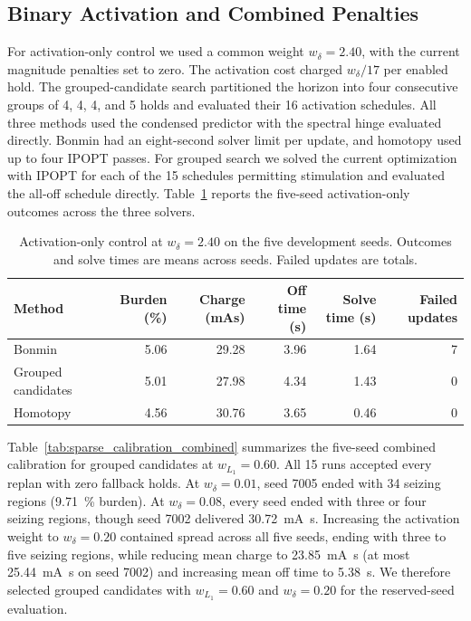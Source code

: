 \FloatBarrier
\subsection{Binary Activation and Combined Penalties}

For activation-only control we used a common weight \(w_\delta=2.40\), with the current magnitude penalties set to zero.
The activation cost charged \(w_\delta/17\) per enabled hold.
The grouped-candidate search partitioned the horizon into four consecutive groups of 4, 4, 4, and 5 holds and evaluated their 16 activation schedules.
All three methods used the condensed predictor with the spectral hinge evaluated directly.
Bonmin had an eight-second solver limit per update, and homotopy used up to four IPOPT passes.
For grouped search we solved the current optimization with IPOPT for each of the 15 schedules permitting stimulation and evaluated the all-off schedule directly.
Table~\ref{tab:sparse_calibration_binary} reports the five-seed activation-only outcomes across the three solvers.

\begin{table}
  \centering
  \caption{Activation-only control at \(w_\delta=2.40\) on the five development seeds.
  Outcomes and solve times are means across seeds. Failed updates are totals.}\label{tab:sparse_calibration_binary}
  \begin{tabular}{@{}lrrrrr@{}}
    \toprule
    Method & Burden (\%) & Charge (mAs) & Off time (s) & Solve time (s) & Failed updates \\
    \midrule
    Bonmin             & 5.06 & 29.28 & 3.96 & 1.64 & 7 \\
    Grouped candidates & 5.01 & 27.98 & 4.34 & 1.43 & 0 \\
    Homotopy           & 4.56 & 30.76 & 3.65 & 0.46 & 0 \\
    \bottomrule
  \end{tabular}
\end{table}

Table~\ref{tab:sparse_calibration_combined} summarizes the five-seed combined calibration for grouped candidates at \(w_{L_1}=0.60\).
All 15 runs accepted every replan with zero fallback holds.
At \(w_\delta=0.01\), seed 7005 ended with 34 seizing regions (\SI{9.71}{\percent} burden).
At \(w_\delta=0.08\), every seed ended with three or four seizing regions, though seed 7002 delivered \SI{30.72}{\milli\ampere\second}.
Increasing the activation weight to \(w_\delta=0.20\) contained spread across all five seeds, ending with three to five seizing regions, while reducing mean charge to \SI{23.85}{\milli\ampere\second} (at most \SI{25.44}{\milli\ampere\second} on seed 7002) and increasing mean off time to \SI{5.38}{\second}.
We therefore selected grouped candidates with \(w_{L_1}=0.60\) and \(w_\delta=0.20\) for the reserved-seed evaluation.

